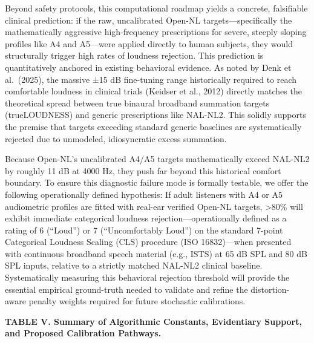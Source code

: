 \documentclass[
  12pt,
]{article}
\begin{document}
Beyond safety protocols, this computational roadmap yields a concrete,
falsifiable clinical prediction: if the raw, uncalibrated Open-NL
targets---specifically the mathematically aggressive high-frequency
prescriptions for severe, steeply sloping profiles like A4 and A5---were
applied directly to human subjects, they would structurally trigger high
rates of loudness rejection. This prediction is quantitatively anchored
in existing behavioral evidence. As noted by Denk et al.~(2025), the
massive ±15 dB fine-tuning range historically required to reach
comfortable loudness in clinical trials (Keidser et al., 2012) directly
matches the theoretical spread between true binaural broadband summation
targets (trueLOUDNESS) and generic prescriptions like NAL-NL2. This
solidly supports the premise that targets exceeding standard generic
baselines are systematically rejected due to unmodeled, idiosyncratic
excess summation.

Because Open-NL's uncalibrated A4/A5 targets mathematically exceed
NAL-NL2 by roughly 11 dB at 4000 Hz, they push far beyond this
historical comfort boundary. To ensure this diagnostic failure mode is
formally testable, we offer the following operationally defined
hypothesis: If adult listeners with A4 or A5 audiometric profiles are
fitted with real-ear verified Open-NL targets, \textgreater80\% will
exhibit immediate categorical loudness rejection---operationally defined
as a rating of 6 (``Loud'') or 7 (``Uncomfortably Loud'') on the
standard 7-point Categorical Loudness Scaling (CLS) procedure (ISO
16832)---when presented with continuous broadband speech material (e.g.,
ISTS) at 65 dB SPL and 80 dB SPL inputs, relative to a strictly matched
NAL-NL2 clinical baseline. Systematically measuring this behavioral
rejection threshold will provide the essential empirical ground-truth
needed to validate and refine the distortion-aware penalty weights
required for future stochastic calibrations.

\textbf{TABLE V. Summary of Algorithmic Constants, Evidentiary Support,
and Proposed Calibration Pathways.}
\end{document}
